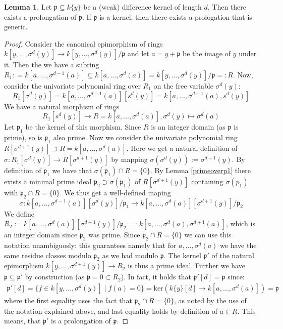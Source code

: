 \documentclass{article}
\def\p{\mathfrak{p}}
\def\s{\sigma}
\def\ker{\text{ker}}
\newenvironment{bew}{\begin{proof}[Proof]}{\end{proof}}
\theoremstyle{definition}
\newtheorem{lem}[Satz]{Lemma}
\begin{document}
\begin{lem}\label{genericprol}
Let $\p \subseteq k\{y\}$ be a (weak) difference kernel of length $d$. Then there exists a prolongation of $\p$. If $\p$ is a kernel, then there exists a prologation that is generic. 
\begin{bew}
Consider the canonical epimorphism of rings $k[y,\ldots,\s^{d}(y)] \rightarrow k[y,\ldots,\s^{d}(y)]/\p$ and let $a = y + \p$ be the image of $y$ under it. 
Then the we have a subring $R_1: = k[a,\ldots,\s^{d-1}(a)] \subseteq k[a,\ldots,\s^{d}(a)] = k[y,\ldots,\s^{d}(y)]/\p =: R$. Now, consider the univariate polynomial ring over $R_1$ on the free variable $\s^d(y)$:
\[ R_1[\s^d(y)] = k[a,\ldots,\s^{d-1}(a)][s^d(y)] = k[a,\ldots,\s^{d-1}(a),s^d(y)] \]
We have a natural morphism of rings \[ R_1[s^d(y)] \rightarrow R = k[a,\ldots,\s^{d}(a)], \s^d(y) \mapsto \s^d(a) \]
Let $\p_1$ be the kernel of this morphism. Since $R$ is an integer domain (as $\p$ is prime), so is $\p_1$ also prime. 
Now we consider the univariate polynomial ring $R[\s^{d+1}(y)] \supset R = k[a,\ldots, \s^d(a)]$. Here we get a natural definition of $\s: R_1[\s^d(y)] \rightarrow R[\s^{d+1}(y)]$ by mapping $\s( \s^d(y))  := \s^{d+1}(y)$.
By definition of $\p_1$ we have that $\s(\p_1) \cap R = \{0\}$. 
By Lemma \ref{primeoverp1} there exists a minimal prime ideal $\p_2 \supset \s(\p_1)$ of $R[\s^{d+1}(y)]$ containing $\s(p_1)$ with $\p_2 \cap R = \{0\}$. 
We thus get a well-defined maping
\[ \s: k[a,\ldots,\s^{d-1}(a)][\s^d(y)]/\p_1 \rightarrow k[a,\ldots, \s^d(a)][\s^{d+1}(y)]/\p_2 \]
We define $R_2:= k[a,\ldots,\s^d(a)][\s^{d+1}(y)]/\p_2 =: k[a,\ldots,\s^d(a),\s^{d+1}(a)]$, which is an integer domain since $\p_2$ was prime. Since $\p_2 \cap R = \{0\}$ we can use this notation unambiguosly:
this guarantees namely that for $a, \ldots, \s^d(a)$ we have the same residue classes modulo $\p_2$ as we had modulo $\p$.
The kernel $\p'$ of the natural epimorphism $k[y,\ldots,\s^{d+1}(y)] \rightarrow R_2$ is thus a prime ideal.
Further we have $\p \subseteq \p'$ by construction (as $\p = 0 \subset R_2$). In fact, it holds that $\p'[d] = \p$ since: 
\begin{align*}
\p'[d] = \{ f \in k[y,\ldots,\s^d(y)] \mid f(a) = 0 \} = \ker( k\{y\}[d] \rightarrow k[a,\ldots,\s^{d}(a)]) = \p
\end{align*}
where the first equality uses the fact that $\p_2 \cap R = \{0\}$, as noted by the use of the notation explained above, and last equality holds by definition of $a \in R$. This means, that $\p'$ is a prolongation of $\p$. 


\end{bew}
\end{lem}
\end{document}
